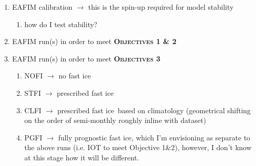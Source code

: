 \documentclass[11pt,a4paper]{article}
\newcommand{\fastice}{fast ice}
\begin{document}
\begin{enumerate}
\begin{enumerate}
\begin{enumerate}
\begin{enumerate}
\begin{enumerate}
        \end{enumerate}
      \end{enumerate}
    \item CICE coupling to ROMS
      \begin{enumerate}
      \item CICE model foundational knowledge
        \begin{enumerate}
        \item jutify why CICE
        \item learn CICE
        \item learn how to compile with ROMS using \texttt{MCT} software
        \item CICE model learning might be a natural follow-on from iceberg distribution
        \item likely running a CICE-ROMS test cast for Mawson coast domain will be huge benefit here
        \end{enumerate}
      \item \textbf{CICE fast-ice parameterisation} $\rightarrow$ this is a key component of my research
      \end{enumerate}
    \end{enumerate}
  \end{enumerate}
\item EAFIM calibration $\rightarrow$ this is the spin-up required for model stability
  \begin{enumerate}
  \item how do I test stability?
  \end{enumerate}
\item EAFIM run(s) in order to meet \textbf{\textsc{Objectives 1 \& 2}}
\item EAFIM run(s) in order to meet \textbf{\textsc{Objectives 3}}
  \begin{enumerate}
  \item \textsc{NOFI} $\rightarrow$ no \fastice~\cite{Liu2017}
  \item \textsc{STFI} $\rightarrow$ prescribed \fastice~\cite{Kusahara2017b}
  \item \textsc{CLFI} $\rightarrow$ prescribed \fastice~based on climatology
    (geometrical shifting on the order of semi-monthly roughly inline with
    \cite{Fraser2020} dataset)
  \item \textsc{PGFI} $\rightarrow$ fully prognostic \fastice, which I'm
    envisioning as separate to the above runs (i.e. IOT to meet Objective 1\&2),
    however, I don't know at this stage how it will be different.

\end{enumerate}
\end{enumerate}
\end{document}

